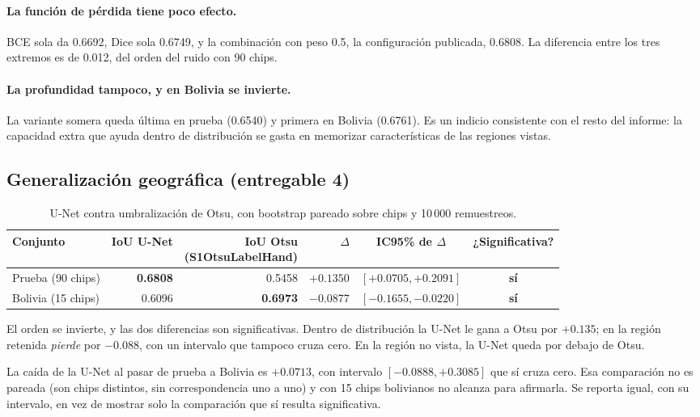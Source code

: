 \documentclass{article}
\begin{document}
\paragraph{La función de pérdida tiene poco efecto.}
BCE sola da 0.6692, Dice sola 0.6749, y la combinación con peso 0.5, la
configuración publicada, 0.6808. La diferencia entre los tres extremos es de
0.012, del orden del ruido con 90 chips.

\paragraph{La profundidad tampoco, y en Bolivia se invierte.}
La variante somera queda última en prueba (0.6540) y primera en
Bolivia (0.6761). Es un indicio consistente con el resto del informe: la
capacidad extra que ayuda dentro de distribución se gasta en memorizar
características de las regiones vistas.

\subsection{Generalización geográfica (entregable 4)}
\label{sec:generalizacion}

\begin{table}[!htbp]
\centering
\caption{U-Net contra umbralización de Otsu, con bootstrap pareado sobre chips y
10\,000 remuestreos.}
\label{tab:generalizacion}
\small
\begin{tabular}{lrrrcc}
\toprule
Conjunto & IoU U-Net & \shortstack[r]{IoU Otsu\\{\scriptsize(S1OtsuLabelHand)}} & $\Delta$ & IC95\% de $\Delta$ & ¿Significativa? \\
\midrule
Prueba (90 chips) & \textbf{0.6808} & 0.5458 & $+0.1350$ & $[+0.0705, +0.2091]$ & \textbf{sí} \\
Bolivia (15 chips) & 0.6096 & \textbf{0.6973} & $-0.0877$ & $[-0.1655, -0.0220]$ & \textbf{sí} \\
\bottomrule
\end{tabular}
\end{table}

El orden se invierte, y las dos diferencias son significativas. Dentro
de distribución la U-Net le gana a Otsu por $+0.135$; en la región retenida
\emph{pierde} por $-0.088$, con un intervalo que tampoco cruza cero. En la
región no vista, la U-Net queda por debajo de Otsu.

La caída de la U-Net al pasar de prueba a Bolivia es $+0.0713$, con intervalo
$[-0.0888, +0.3085]$ que sí cruza cero. Esa comparación no es
pareada (son chips distintos, sin correspondencia uno a uno) y con 15 chips
bolivianos no alcanza para afirmarla. Se reporta igual, con su intervalo, en vez
de mostrar solo la comparación que sí resulta significativa.
\end{document}
